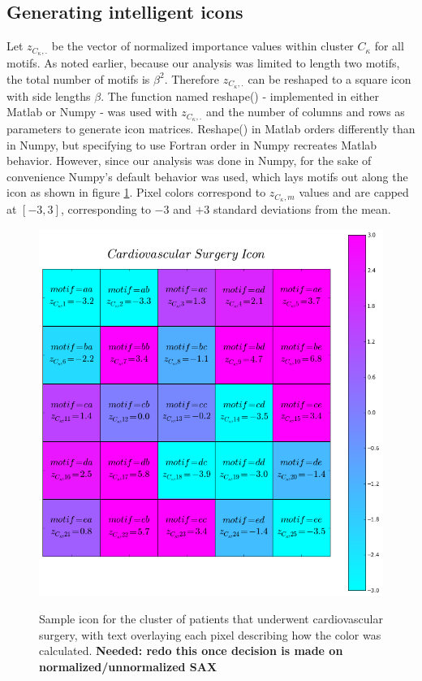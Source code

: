 \subsection{Generating intelligent icons}
Let $z_{C_{\kappa},.}$ be the vector of normalized importance values within cluster $C_\kappa$ for all motifs. As noted earlier, because our analysis was limited to length two motifs, the total number of motifs is $\beta^2$. Therefore $z_{C_{\kappa},.}$ can be reshaped to a square icon with side lengths $\beta$. The function named reshape() - implemented in either Matlab or Numpy - was used with $z_{C_{\kappa},.}$ and the number of columns and rows as parameters to generate icon matrices. Reshape() in Matlab orders differently than in Numpy, but specifying to use Fortran order in Numpy recreates Matlab behavior. However, since our analysis was done in Numpy, for the sake of convenience Numpy's default behavior was used, which lays motifs out along the icon as shown in figure \ref{fig:example_icon}. Pixel colors correspond to $z_{C_{\kappa},m}$ values and are capped at $[-3,3]$, corresponding to $-3$ and $+3$ standard deviations from the mean.

\begin{figure}[h]
  \includegraphics[scale=0.35]{./Figures/example_icon.png}\\
  \caption{Sample icon for the cluster of patients that underwent cardiovascular surgery, with text overlaying each pixel describing how the color was calculated. \textbf{Needed: redo this once decision is made on normalized/unnormalized SAX}}\label{fig:example_icon}
\end{figure} 